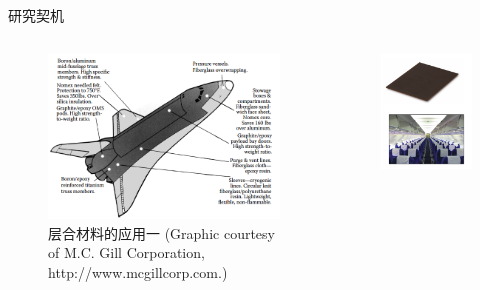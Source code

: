 \documentclass{beamer}
\begin{document}
\begin{frame}{研究契机}
	\begin{columns}
		\begin{column}{0.6\textwidth}
			\begin{figure}
				\includegraphics[width=1.0\linewidth]{fig/part0/space-shuttle.png}
				\caption{层合材料的应用一 (Graphic courtesy of M.C. Gill Corporation,
				http://www.mcgillcorp.com.)}
			\end{figure}
		\end{column}
		\begin{column}{0.4\textwidth}
			\begin{figure}
				\includegraphics[width=1.0\linewidth]{fig/part0/laminate_product.png}

\end{figure}
\end{column}
\end{columns}
\end{frame}
\end{document}
